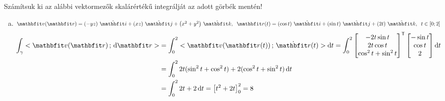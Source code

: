 \documentclass[exercise]{math-standalone}
\begin{document}
\begin{exercise}{Számítsuk ki az alábbi vektormezők skalárértékű integrálját az adott görbék mentén!}
{\begin{enumerate}[a)]
      \item $\rvec v(\rvec r) = \ijk{-yz}{xz}{x^2 + y^2}, \;\; \rvec r(t) = \ijk{\cos t}{\sin t}{2t}, \;\; t \in [0; 2]$
            \begin{align*}
              \int_\gamma \scalar{\rvec v(\rvec r)}{\diff \rvec r}
               & = \int_0^2 \scalar{\rvec v(\rvec r(t))}{\dot{\rvec r}(t)} \diff t
              = \int_0^2
              \begin{bmatrix}
                -2t \sin t \\
                2t \cos t  \\
                \cos^2 t + \sin^2 t
              \end{bmatrix}^\transpose
              \begin{bmatrix}
                - \sin t \\
                \cos t   \\
                2
              \end{bmatrix} \diff t
              \\
               & = \int_0^2 2t ( \sin^2 t + \cos^2 t ) + 2 ( \cos^2 t + \sin^2 t ) \, \diff t
              \\
               & = \int_0^2 2t + 2 \, \diff t
              = \left[ t^2 + 2t \right]_0^2
              = 8
            \end{align*}


\end{enumerate}}
\end{exercise}
\end{document}

